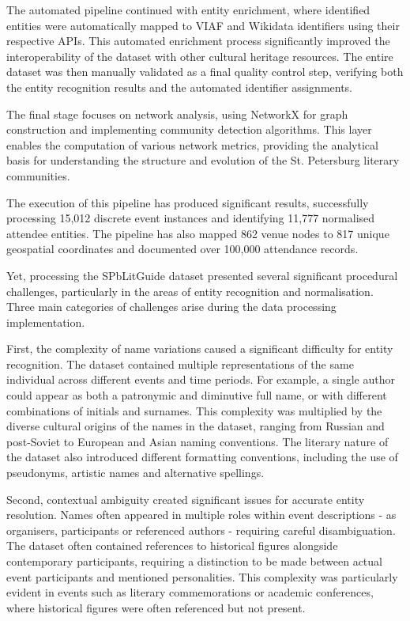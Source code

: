\documentclass{jcls}
\begin{document}
The automated pipeline continued with entity enrichment, where identified entities were automatically mapped to VIAF and Wikidata identifiers using their respective APIs. This automated enrichment process significantly improved the interoperability of the dataset with other cultural heritage resources. The entire dataset was then manually validated as a final quality control step, verifying both the entity recognition results and the automated identifier assignments.

The final stage focuses on network analysis, using NetworkX for graph construction and implementing community detection algorithms. This layer enables the computation of various network metrics, providing the analytical basis for understanding the structure and evolution of the St. Petersburg literary communities.

The execution of this pipeline has produced significant results, successfully processing 15,012 discrete event instances and identifying 11,777 normalised attendee entities. The pipeline has also mapped 862 venue nodes to 817 unique geospatial coordinates and documented over 100,000 attendance records.

Yet, processing the SPbLitGuide dataset presented several significant procedural challenges, particularly in the areas of entity recognition and normalisation. Three main categories of challenges arise during the data processing implementation.

First, the complexity of name variations caused a significant difficulty for entity recognition. The dataset contained multiple representations of the same individual across different events and time periods. For example, a single author could appear as both a patronymic and diminutive full name, or with different combinations of initials and surnames. This complexity was multiplied by the diverse cultural origins of the names in the dataset, ranging from Russian and post-Soviet to European and Asian naming conventions. The literary nature of the dataset also introduced different formatting conventions, including the use of pseudonyms, artistic names and alternative spellings.

Second, contextual ambiguity created significant issues for accurate entity resolution. Names often appeared in multiple roles within event descriptions - as organisers, participants or referenced authors - requiring careful disambiguation. The dataset often contained references to historical figures alongside contemporary participants, requiring a distinction to be made between actual event participants and mentioned personalities. This complexity was particularly evident in events such as literary commemorations or academic conferences, where historical figures were often referenced but not present.
\end{document}
